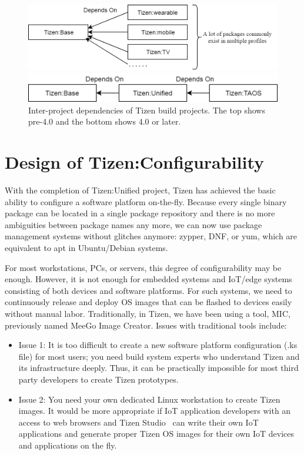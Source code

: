 \begin{figure}
\centering
  \includegraphics[width=0.95\columnwidth]{figures/InterprojectDeps_Old.png}
  
  \vspace{0.1cm}
  
  \includegraphics[width=0.85\columnwidth]{figures/InterprojectDeps_New.png}
\caption{Inter-project dependencies of Tizen build projects. The top shows pre-4.0 and the bottom shows 4.0 or later.}
\label{FIG_TZN_INTERPDEP}
\end{figure}

\section{Design of Tizen:Configurability}\label{S_Design_Tizen_Conf}

With the completion of Tizen:Unified project, Tizen has achieved the basic ability to configure a software platform on-the-fly.
Because every single binary package can be located in a single package repository and there is no more ambiguities between package names any more, we can now use package management systems without glitches anymore: zypper, DNF, or yum, which are equivalent to apt in Ubuntu/Debian systems.


For most workstations, PCs, or servers, this degree of configurability may be enough.
However, it is not enough for embedded systems and IoT/edge systems consisting of both devices and software platforms.
For such systems, we need to continuously release and deploy OS images that can be flashed to devices easily without manual labor.
Traditionally, in Tizen, we have been using a tool, MIC, previously named MeeGo Image Creator.
Issues with traditional tools include:

\begin{itemize}
\item Issue 1: It is too difficult to create a new software platform configuration (.ks file) for most users; you need build system experts who understand Tizen and its infrastructure deeply. Thus, it can be practically impossible for most third party developers to create Tizen prototypes.
\item Issue 2: You need your own dedicated Linux workstation to create Tizen images. It would be more appropriate if IoT application developers with an access to web browsers and Tizen Studio~\cite{23tizenstudio2018} can write their own IoT applications and generate proper Tizen OS images for their own IoT devices and applications on the fly.
\end{itemize}

